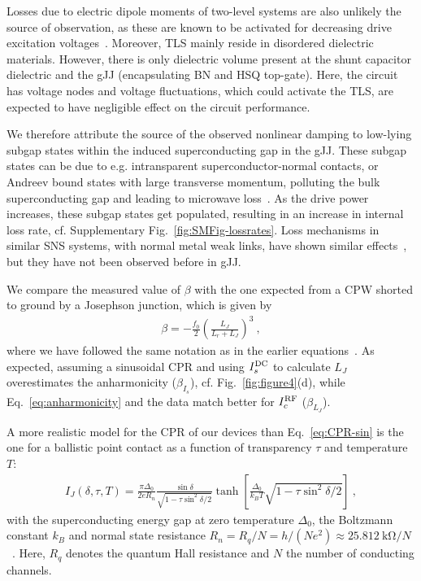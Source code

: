 Losses due to electric dipole moments of two-level systems are also unlikely the source of observation, as these are known to be activated for decreasing drive excitation voltages~\cite{martinisDecoherenceJosephsonQubits2005c,oconnellMicrowaveDielectricLoss2008a,gunnarssonDielectricLossesMultilayer2013}.
%
Moreover, TLS mainly reside in disordered dielectric materials.
%
However, there is only dielectric volume present at the shunt capacitor dielectric and the gJJ (encapsulating BN and HSQ top-gate).
%
Here, the circuit has voltage nodes and voltage fluctuations, which could activate the TLS, are expected to have negligible effect on the circuit performance.

We therefore attribute the source of the observed nonlinear damping to low-lying subgap states within the induced superconducting gap in the gJJ.
%
These subgap states can be due to e.g. intransparent superconductor-normal contacts, or Andreev bound states with large transverse momentum, polluting the bulk superconducting gap and leading to microwave loss~\cite{schmidtBallisticGrapheneSuperconducting2018}.
%
As the drive power increases, these subgap states get populated, resulting in an increase in internal loss rate, cf. Supplementary Fig.~\ref{fig:SMFig-lossrates}.
%
Loss mechanisms in similar SNS systems, with normal metal weak links, have shown similar effects~\cite{fuechsleEffectMicrowavesCurrentPhase2009,dassonnevilleDissipationSupercurrentFluctuations2013}, but they have not been observed before in gJJ.

We compare the measured value of $\beta$ with the one expected from a CPW shorted to ground by a Josephson junction, which is given by
\begin{align}
\beta=-\frac{f_0}{2} \left(\frac{L_J}{L_r+L_J}\right)^3\ ,
\label{eq:anharmonicity}
\end{align}
%
where we have followed the same notation as in the earlier equations~\cite{wilsonPhotonGenerationElectromagnetic2010b,zhouHighgainWeaklyNonlinear2014}.
%
As expected, assuming a sinusoidal CPR and using $I_s^{\rm DC}$ to calculate $L_J$ overestimates the anharmonicity ($\beta_{I_s}$), cf. Fig.~\ref{fig:figure4}(d), while Eq.~\ref{eq:anharmonicity} and the data match better for $I_c^{\rm RF}$ ($\beta_{L_J}$).

A more realistic model for the CPR of our devices than Eq.~\ref{eq:CPR-sin} is the one for a ballistic point contact as a function of transparency $\tau$ and temperature $T$:
%
\begin{align}
I_J(\delta,\tau,T) = \frac{\pi\Delta_0}{2 e R_n} \frac{\sin\delta}{\sqrt{1 - \tau \sin^2\delta / 2}} \tanh\left[\frac{\Delta_0}{k_B T} \sqrt{1 - \tau \sin^2\delta / 2}\right]\ ,
\label{eq:CPR-ball}
\end{align}
%
with the superconducting energy gap at zero temperature $\Delta_0$, the Boltzmann constant $k_B$ and normal state resistance $R_n= R_q/N = h/(Ne^2)\approx \SI{25.812}{\kilo\ohm} / N$~\cite{golubovCurrentphaseRelationJosephson2004a,leeUltimatelyShortBallistic2015}.
%
Here, $R_q$ denotes the quantum Hall resistance and $N$ the number of conducting channels.

